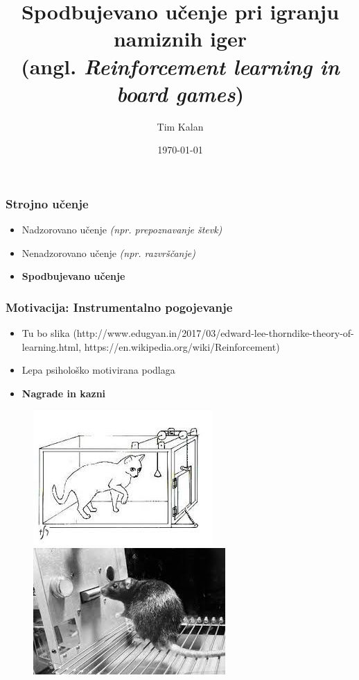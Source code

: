 \documentclass{beamer}    %
\author{Tim Kalan}
\institute[FMF]{Fakulteta za matematiko in fiziko}
\title{
    Spodbujevano učenje pri igranju namiznih iger \\ 
    \large (angl. \textit{Reinforcement learning in board games})}
\date{\today}
\begin{document}
\begin{frame}
    \titlepage
\end{frame}


\begin{frame}
    \frametitle{Strojno učenje}
    \begin{itemize}
        \item Nadzorovano učenje \textit{(npr. prepoznavanje števk)}
        \item Nenadzorovano učenje \textit{(npr. razvrščanje)}
        \item \textbf{Spodbujevano učenje}
    \end{itemize}
\end{frame}


\begin{frame}
    \frametitle{Motivacija: Instrumentalno pogojevanje}
    \begin{itemize}
        \item Tu bo slika 
        (http://www.edugyan.in/2017/03/edward-lee-thorndike-theory-of-learning.html, 
        https://en.wikipedia.org/wiki/Reinforcement)
        \item Lepa psihološko motivirana podlaga
        \item \textbf{Nagrade in kazni} 
    \end{itemize}

    \begin{figure}[b]
        \includegraphics[scale=0.47]{slike/macka.jpg}
        \includegraphics[scale=0.5]{slike/miska.jpg}
    \end{figure}
\end{frame}
\end{document}
